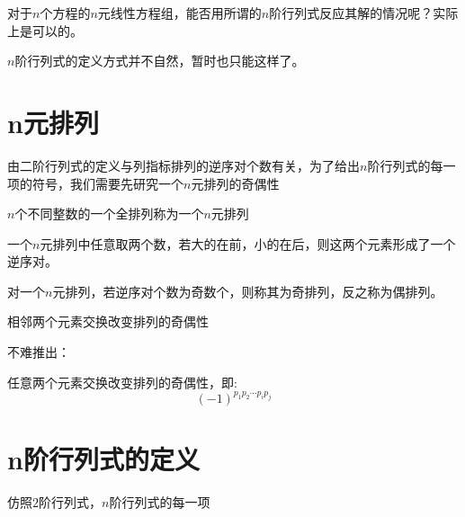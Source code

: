 对于$n$个方程的$n$元线性方程组，能否用所谓的$n$阶行列式反应其解的情况呢？实际上是可以的。
\begin{remark}
    $n$阶行列式的定义方式并不自然，暂时也只能这样了。
\end{remark}

\section{n元排列}
由二阶行列式的定义与列指标排列的逆序对个数有关，为了给出$n$阶行列式的每一项的符号，我们需要先研究一个$n$元排列的奇偶性
\begin{definition}
    $n$个不同整数的一个全排列称为一个$n$元排列
\end{definition}
\begin{definition}
    一个$n$元排列中任意取两个数，若大的在前，小的在后，则这两个元素形成了一个逆序对。
\end{definition}
\begin{definition}
    对一个$n$元排列，若逆序对个数为奇数个，则称其为奇排列，反之称为偶排列。
\end{definition}
\begin{theorem}
    相邻两个元素交换改变排列的奇偶性
\end{theorem}
不难推出：
\begin{theorem}
    任意两个元素交换改变排列的奇偶性，即:
    \begin{equation*}
        (-1)^{p_{1}p_{2}\cdots p_{i}p_{j}}
    \end{equation*}
\end{theorem}

\section{n阶行列式的定义}
仿照$2$阶行列式，$n$阶行列式的每一项